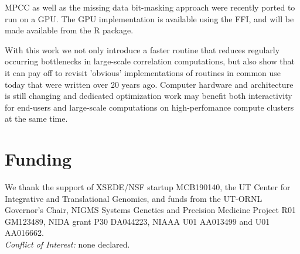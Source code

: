 \documentclass{bioinfo}
\begin{document}
MPCC as well as the missing data bit-masking approach were recently
ported to run on a GPU. The GPU implementation is available using the
FFI, and will be made available from the R package.

With this work we not only introduce a faster routine that reduces
regularly occurring bottlenecks in large-scale correlation computations, but
also show that it can pay off to revisit 'obvious' implementations
of routines in common use today that were written over 20 years
ago. Computer hardware and architecture is still changing and
dedicated optimization work may benefit both interactivity for
end-users and large-scale computations on high-perfomance compute
clusters at the same time.

\vspace*{-6mm}
\section*{Funding}

We thank the support of XSEDE/NSF startup MCB190140, the UT Center for
Integrative and Translational Genomics, and funds from the UT-ORNL
Governor's Chair, NIGMS Systems Genetics and Precision Medicine
Project R01 GM123489, NIDA grant P30 DA044223, NIAAA U01 AA013499 and
U01 AA016662.\\
\textit{Conflict of Interest:} none declared.

\vspace*{-5mm}


\end{document}
